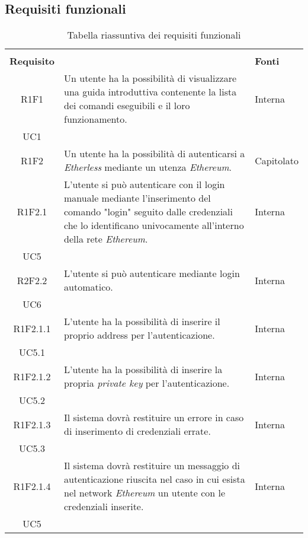 \subsection{Requisiti funzionali}

\renewcommand{\arraystretch}{2.2}

\begin{longtable}{|c|p{8cm}|C{2cm}|}
	
	\caption{Tabella riassuntiva dei requisiti funzionali}\\
	
	
	\textbf{Requisito} &  & \textbf{Fonti}\\
	
	\endhead
	
	R1F1 & Un utente ha la possibilità di visualizzare una guida introduttiva contenente la lista dei comandi eseguibili e il loro funzionamento. &  \centering Interna \\ UC1 \tabularnewline
	
	R1F2 & Un utente ha la possibilità di autenticarsi a \textit{Etherless} mediante un utenza \textit{Ethereum\glos}. & Capitolato \\
	
	R1F2.1 & L'utente si può autenticare con il login manuale mediante l'inserimento del comando "login" seguito dalle credenziali che lo identificano univocamente all'interno della rete \textit{Ethereum\glos}.  & \centering Interna \\ UC5 \tabularnewline
	
	R2F2.2 & L'utente si può autenticare mediante login automatico. & \centering Interna \\ UC6 \tabularnewline
	
	R1F2.1.1 &  L'utente ha la possibilità di inserire il proprio address per l'autenticazione. & \centering Interna \\ UC5.1 \tabularnewline
	
	R1F2.1.2 &  L'utente ha la possibilità di inserire la propria \textit{private key\glo} per l'autenticazione. & \centering Interna \\ UC5.2 \tabularnewline
	
	R1F2.1.3 &  Il sistema dovrà restituire un errore in caso di inserimento di credenziali errate. & \centering Interna \\ UC5.3 \tabularnewline
	
	R1F2.1.4 &  Il sistema dovrà restituire un messaggio di autenticazione riuscita nel caso in cui esista nel network \textit{Ethereum\glo} un utente con le credenziali inserite. & \centering Interna \\ UC5 \tabularnewline
	

\end{longtable}
